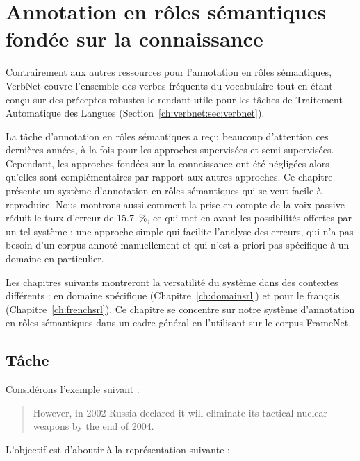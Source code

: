 \chapter{Annotation en rôles sémantiques fondée sur la connaissance}
\label{ch:srl}



Contrairement aux autres ressources pour l'annotation en rôles sémantiques,
VerbNet couvre l'ensemble des verbes fréquents du vocabulaire tout en étant
conçu sur des préceptes robustes le rendant utile pour les tâches de Traitement
Automatique des Langues (Section~\ref{ch:verbnet:sec:verbnet}).

La tâche d'annotation en rôles sémantiques a reçu beaucoup d'attention ces
dernières années, à la fois pour les approches supervisées et semi-supervisées.
Cependant, les approches fondées sur la connaissance ont été négligées alors
qu'elles sont complémentaires par rapport aux autres approches. Ce chapitre
présente un système d'annotation en rôles sémantiques qui se veut facile à
reproduire. Nous montrons aussi comment la prise en compte de la voix passive
réduit le taux d'erreur de 15.7~\%, ce qui met en avant les possibilités
offertes par un tel système : une approche simple qui facilite l'analyse des
erreurs, qui n'a pas besoin d'un corpus annoté manuellement et qui n'est a
priori pas spécifique à un domaine en particulier.

Les chapitres suivants montreront la versatilité du système dans des contextes
différents : en domaine spécifique (Chapitre~\ref{ch:domainsrl}) et pour le
français (Chapitre~\ref{ch:frenchsrl}). Ce chapitre se concentre sur notre
système d'annotation en rôles sémantiques dans un cadre général en l'utilisant
sur le corpus FrameNet.

\section{Tâche}

Considérons l'exemple suivant :

\begin{quote}
However, in 2002 Russia declared it will eliminate its tactical nuclear weapons by the end of 2004.
\end{quote}

L'objectif est d'aboutir à la représentation suivante :

